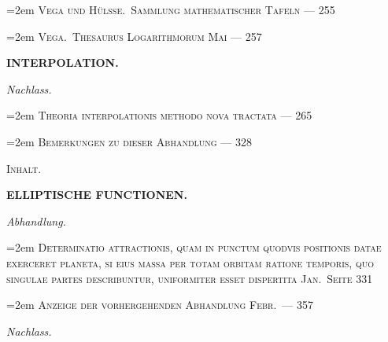 \documentclass[12pt,a4paper]{article}
\begin{document}
\vspace{0.3em}
\noindent\hangindent=2em
\textsc{Vega und H\"ulsse.\ Sammlung mathematischer Tafeln  \dotfill --- 255}

\vspace{0.3em}
\noindent\hangindent=2em
\textsc{Vega.\ Thesaurus Logarithmorum  Mai \dotfill --- 257}

\vspace{1em}
\begin{center}
\textbf{INTERPOLATION.}
\end{center}

\vspace{0.3em}
\noindent\textit{Nachlass.}

\vspace{0.3em}
\noindent\hangindent=2em
\textsc{Theoria interpolationis methodo nova tractata \dotfill --- 265}

\vspace{0.3em}
\noindent\hangindent=2em
\textsc{Bemerkungen zu dieser Abhandlung \dotfill --- 328}

\newpage

\begin{center}
\textsc{Inhalt.}
\end{center}

\begin{center}
\textbf{ELLIPTISCHE FUNCTIONEN.}
\end{center}

\vspace{0.5em}

\noindent\textit{Abhandlung.}

\vspace{0.3em}
\noindent\hangindent=2em
\textsc{Determinatio attractionis, quam in punctum quodvis positionis datae exerceret\linebreak
\hspace*{\fill} planeta, si eius massa per totam orbitam ratione temporis, quo singulae\linebreak
\hspace*{\fill} partes describuntur, uniformiter esset dispertita  Jan.\ \dotfill Seite 331}

\vspace{0.3em}
\noindent\hangindent=2em
\textsc{Anzeige der vorhergehenden Abhandlung  Febr.\ \dotfill --- 357}

\vspace{0.5em}
\noindent\textit{Nachlass.}
\end{document}
